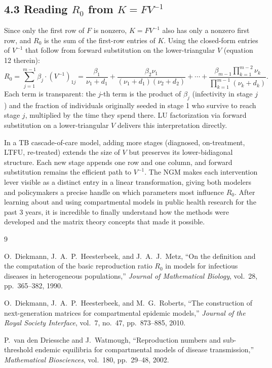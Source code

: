 \documentclass[12pt]{article}
\theoremstyle{plain}
\theoremstyle{definition}
\begin{document}
\subsection*{4.3 \quad Reading $R_0$ from $K = FV^{-1}$}

Since only the first row of $F$ is nonzero, $K = FV^{-1}$ also has only a nonzero first
row, and $R_0$ is the sum of the first-row entries of $K$. Using the closed-form entries
of $V^{-1}$ that follow from forward substitution on the lower-triangular $V$
\cite{vddriessche2002} (equation 12 therein):
\[
  R_0 = \sum_{j=1}^{m-1} \beta_j \cdot (V^{-1})_{1j}
      = \frac{\beta_1}{\nu_1+d_1}
        + \frac{\beta_2\nu_1}{(\nu_1+d_1)(\nu_2+d_2)}
        + \cdots
        + \frac{\beta_{m-1}\prod_{k=1}^{m-2}\nu_k}{\prod_{k=1}^{m-1}(\nu_k+d_k)}.
\]
Each term is transparent: the $j$-th term is the product of $\beta_j$ (infectivity in stage
$j$) and the fraction of individuals originally seeded in stage 1 who survive to reach stage
$j$, multiplied by the time they spend there. LU factorization via forward substitution on a
lower-triangular $V$ delivers this interpretation directly.

In a TB cascade-of-care model, adding more stages (diagnosed, on-treatment, LTFU,
re-treated) extends the size of $V$ but preserves its lower-bidiagonal structure. Each new
stage appends one row and one column, and forward substitution remains the efficient path
to $V^{-1}$. The NGM makes each intervention lever visible as a distinct entry in a linear
transformation, giving both modelers and policymakers a precise handle on which parameters
most influence $R_0$. After learning about and using compartmental models in public health
research for the past 3 years, it is incredible to finally understand how the methods were
developed and the matrix theory concepts that made it possible.

\newpage
\begin{thebibliography}{9}

O.\ Diekmann, J.\ A.\ P.\ Heesterbeek, and J.\ A.\ J.\ Metz,
``On the definition and the computation of the basic reproduction ratio $R_0$ in
models for infectious diseases in heterogeneous populations,''
\textit{Journal of Mathematical Biology}, vol.\ 28, pp.\ 365--382, 1990.

O.\ Diekmann, J.\ A.\ P.\ Heesterbeek, and M.\ G.\ Roberts,
``The construction of next-generation matrices for compartmental epidemic models,''
\textit{Journal of the Royal Society Interface}, vol.\ 7, no.\ 47, pp.\ 873--885, 2010.

P.\ van den Driessche and J.\ Watmough,
``Reproduction numbers and sub-threshold endemic equilibria for compartmental models
of disease transmission,''
\textit{Mathematical Biosciences}, vol.\ 180, pp.\ 29--48, 2002.

\end{thebibliography}
\end{document}
